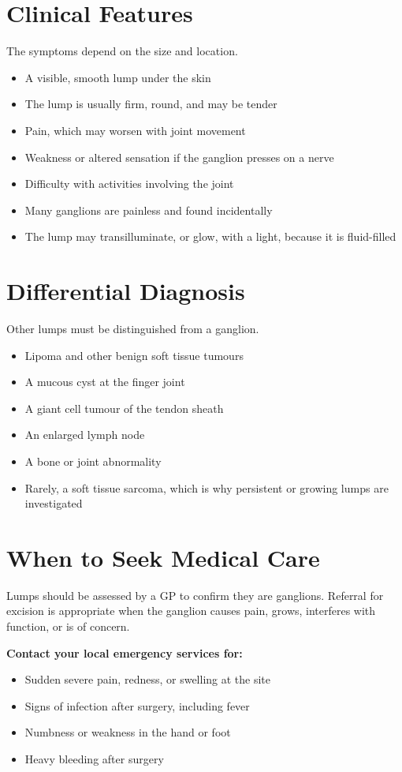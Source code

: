 \section*{Clinical Features}
The symptoms depend on the size and location.
\begin{itemize}
    \item A visible, smooth lump under the skin
    \item The lump is usually firm, round, and may be tender
    \item Pain, which may worsen with joint movement
    \item Weakness or altered sensation if the ganglion presses on a nerve
    \item Difficulty with activities involving the joint
    \item Many ganglions are painless and found incidentally
    \item The lump may transilluminate, or glow, with a light, because it is fluid-filled
\end{itemize}

\section*{Differential Diagnosis}
Other lumps must be distinguished from a ganglion.
\begin{itemize}
    \item Lipoma and other benign soft tissue tumours
    \item A mucous cyst at the finger joint
    \item A giant cell tumour of the tendon sheath
    \item An enlarged lymph node
    \item A bone or joint abnormality
    \item Rarely, a soft tissue sarcoma, which is why persistent or growing lumps are investigated
\end{itemize}

\section*{When to Seek Medical Care}
Lumps should be assessed by a GP to confirm they are ganglions. Referral for excision is appropriate when the ganglion causes pain, grows, interferes with function, or is of concern.

\textbf{Contact your local emergency services for:}
\begin{itemize}
    \item Sudden severe pain, redness, or swelling at the site
    \item Signs of infection after surgery, including fever
    \item Numbness or weakness in the hand or foot
    \item Heavy bleeding after surgery
\end{itemize}


